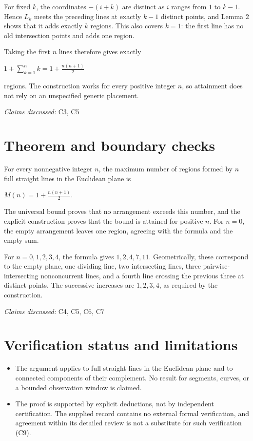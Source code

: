 \documentclass[11pt]{article}
\begin{document}
For fixed $k$, the coordinates $-(i+k)$ are distinct as $i$ ranges from $1$ to $k-1$. Hence $L_k$ meets the preceding lines at exactly $k-1$ distinct points, and Lemma 2 shows that it adds exactly $k$ regions. This also covers $k=1$: the first line has no old intersection points and adds one region.

Taking the first $n$ lines therefore gives exactly

$1+\sum_{k=1}^{n}k=1+\frac{n(n+1)}{2}$

regions. The construction works for every positive integer $n$, so attainment does not rely on an unspecified generic placement.

\textit{Claims discussed: }C3, C5
\section{Theorem and boundary checks}
For every nonnegative integer $n$, the maximum number of regions formed by $n$ full straight lines in the Euclidean plane is

$M(n)=1+\frac{n(n+1)}{2}.$

The universal bound proves that no arrangement exceeds this number, and the explicit construction proves that the bound is attained for positive $n$. For $n=0$, the empty arrangement leaves one region, agreeing with the formula and the empty sum.

For $n=0,1,2,3,4$, the formula gives $1,2,4,7,11$. Geometrically, these correspond to the empty plane, one dividing line, two intersecting lines, three pairwise-intersecting nonconcurrent lines, and a fourth line crossing the previous three at distinct points. The successive increases are $1,2,3,4$, as required by the construction.

\textit{Claims discussed: }C4, C5, C6, C7
\section{Verification status and limitations}
\begin{itemize}
\item The argument applies to full straight lines in the Euclidean plane and to connected components of their complement. No result for segments, curves, or a bounded observation window is claimed.
\item The proof is supported by explicit deductions, not by independent certification. The supplied record contains no external formal verification, and agreement within its detailed review is not a substitute for such verification (C9).
\end{itemize}
\end{document}
